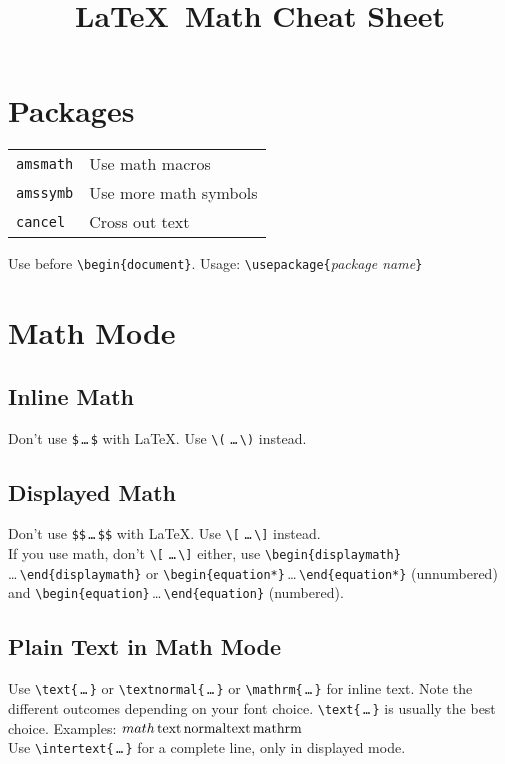 \documentclass[draft]{../cheatsht/cheatsht}
\begin{document}
\title{\LaTeX~Math Cheat Sheet}

\section{Packages}

\begin{tabular}{@{}ll@{}}
\texttt{amsmath} & Use math macros \\
\texttt{amssymb} & Use more math symbols \\
\texttt{cancel} & Cross out text
\end{tabular}

Use before \verb!\begin{document}!.
Usage: \verb!\usepackage{!\textit{package name}\verb!}!

\section{Math Mode}
\subsection{Inline Math}
Don't use \verb!$!\,\verb!…!\,\verb!$! with \LaTeX.
Use \verb!\(! \verb!…!\,\verb!\)! instead.

\subsection{Displayed Math}
Don't use \verb!$$!\,\verb!…!\,\verb!$$! with \LaTeX. Use
\verb!\[! \verb!…!\,\verb!\]! instead. \\

If you use \AmS\hspace{1pt}math, don't \verb!\[! \verb!…!\,\verb!\]! either,
use \verb!\begin{displaymath}!\\\ldots\,\verb!\end{displaymath}! or
\verb!\begin{equation*}!\,\ldots\,\verb!\end{equation*}!
(unnumbered) and \verb!\begin{equation}!\,\ldots\,\verb!\end{equation}!
(numbered).

\subsection{Plain Text in Math Mode}
Use \verb!\text{!\,\verb!…!\,\verb!}! or \verb!\textnormal{!\,\verb!…!\,\verb!}!
or \verb!\mathrm{!\,\verb!…!\,\verb!}! for inline text.
Note the different outcomes depending on your font choice.
\verb!\text{!\,\verb!…!\,\verb!}! is usually the best choice. Examples:
\( math\,\text{text}\,\textnormal{normaltext}\,\mathrm{mathrm}\)\\
Use \verb!\intertext{!\,\verb!…!\,\verb!}! for a complete line, only in
displayed mode.
\end{document}
